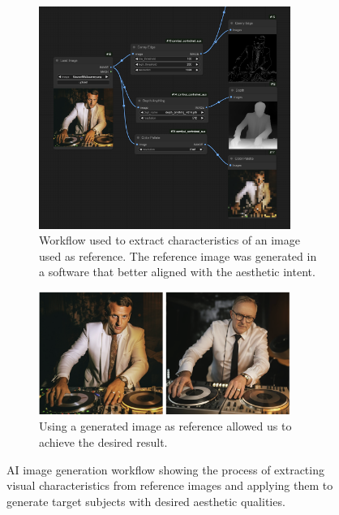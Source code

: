 \begin{figure}[htbp]
    \centering

    \begin{subfigure}[b]{\textwidth}
        \centering
        \includegraphics[width=0.9\textwidth]{controlnetworkflow.png}
        \caption{Workflow used to extract characteristics of an image used as reference. The reference image was generated in a software that better aligned with the aesthetic intent.}
        \label{fig:controlnetworkflow}
    \end{subfigure}


    \begin{subfigure}[b]{\textwidth}
        \centering
        \includegraphics[width=0.9\textwidth]{inputoutput.png}
        \caption{Using a generated image as reference allowed us to achieve the desired result.}
        \label{fig:inputoutput}
    \end{subfigure}

    \caption{AI image generation workflow showing the process of extracting visual characteristics from reference images and applying them to generate target subjects with desired aesthetic qualities.}
    \label{fig:ai_generation_workflow}
\end{figure}

